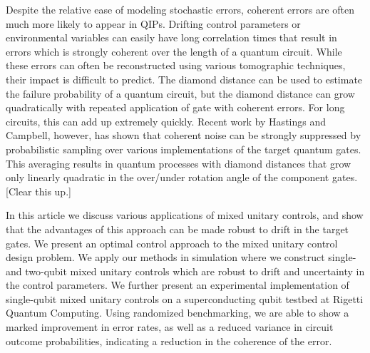 \documentclass[aps,nofootinbib,pra,notitlepage,twocolumn]{revtex4-1}
\newcommand{\note}[1]{{\color{red}[#1]}}
\begin{document}
Despite the relative ease of modeling stochastic errors, coherent errors are often much more likely to appear in QIPs. Drifting control parameters or environmental variables can easily have long correlation times that result in errors which is strongly coherent over the length of a quantum circuit. While these errors can often be reconstructed using various tomographic techniques, their impact is difficult to predict. The diamond distance can be used to estimate the failure probability of a quantum circuit, but the diamond distance can grow quadratically with repeated application of gate with coherent errors. For long circuits, this can add up extremely quickly. Recent work by Hastings and Campbell, however, has shown that coherent noise can be strongly suppressed by probabilistic sampling over various implementations of the target quantum gates. This averaging results in quantum processes with diamond distances that grow only linearly  quadratic in the over/under rotation angle of the component gates. \note{Clear this up.}

In this article we discuss various applications of mixed unitary controls, and show that the advantages of this approach can be made robust to drift in the target gates. We present an optimal control approach to the mixed unitary control design problem. We apply our methods in simulation where we construct single- and two-qubit mixed unitary controls which are robust to drift and uncertainty in the control parameters. We further present an experimental implementation of single-qubit mixed unitary controls on a superconducting qubit testbed at Rigetti Quantum Computing. Using randomized benchmarking, we are able to show a marked improvement in error rates, as well as a reduced variance in circuit outcome probabilities, indicating a reduction in the coherence of the error.



\end{document}
